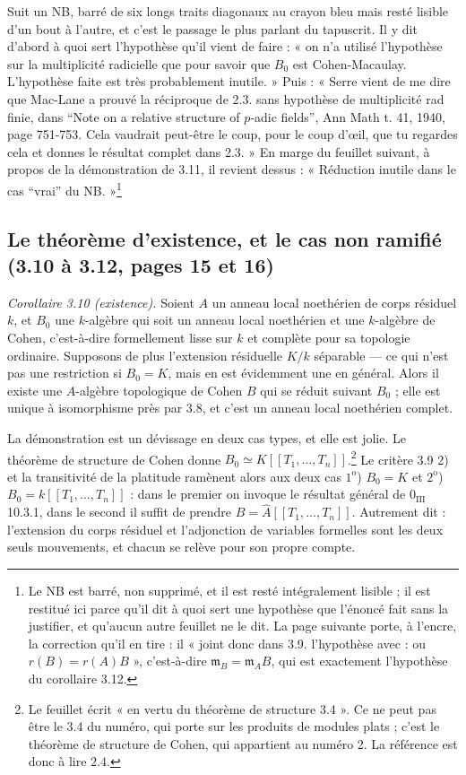 \documentclass[11pt,a4paper]{article}
\begin{document}
Suit un NB, barré de six longs traits diagonaux au crayon bleu mais resté
lisible d'un bout à l'autre, et c'est le passage le plus parlant du tapuscrit.
Il y dit d'abord à quoi sert l'hypothèse qu'il vient de faire : « on n'a
utilisé l'hypothèse sur la multiplicité radicielle que pour savoir que $B_0$
est Cohen-Macaulay. L'hypothèse faite est très probablement inutile. » Puis :
« Serre vient de me dire que Mac-Lane a prouvé la réciproque de 2.3. sans
hypothèse de multiplicité rad finie, dans “Note on a relative structure of
$p$-adic fields”, Ann Math t. 41, 1940, page 751-753. Cela vaudrait peut-être
le coup, pour le coup d'œil, que tu regardes cela et donnes le résultat complet
dans 2.3. » En marge du feuillet suivant, à propos de la démonstration de 3.11,
il revient dessus : « Réduction inutile dans le cas “vrai” du
NB. »\footnote{Le NB est barré, non supprimé, et il est resté intégralement
lisible ; il est restitué ici parce qu'il dit à quoi sert une hypothèse que
l'énoncé fait sans la justifier, et qu'aucun autre feuillet ne le dit. La page
suivante porte, à l'encre, la correction qu'il en tire : il « joint donc dans
3.9. l'hypothèse avec : ou $r(B) = r(A)B$ », c'est-à-dire
$\mathfrak{m}_B = \mathfrak{m}_A B$, qui est exactement l'hypothèse du
corollaire 3.12.}

\subsection*{Le théorème d'existence, et le cas non ramifié (3.10 à 3.12, pages 15 et 16)}

\emph{Corollaire 3.10 (existence).} Soient $A$ un anneau local noethérien de
corps résiduel $k$, et $B_0$ une $k$-algèbre qui soit un anneau local
noethérien et une $k$-algèbre de Cohen, c'est-à-dire formellement lisse sur $k$
et complète pour sa topologie ordinaire. Supposons de plus l'extension
résiduelle $K/k$ séparable — ce qui n'est pas une restriction si $B_0 = K$,
mais en est évidemment une en général. Alors il existe une $A$-algèbre
topologique de Cohen $B$ qui se réduit suivant $B_0$ ; elle est unique à
isomorphisme près par 3.8, et c'est un anneau local noethérien complet.

La démonstration est un dévissage en deux cas types, et elle est jolie. Le
théorème de structure de Cohen donne $B_0 \simeq K[[T_1, \ldots,
T_n]]$.\footnote{Le feuillet écrit « en vertu du théorème de structure 3.4 ».
Ce ne peut pas être le 3.4 du numéro, qui porte sur les produits de modules
plats ; c'est le théorème de structure de Cohen, qui appartient au numéro 2. La
référence est donc à lire $2.4$.} Le critère 3.9 2) et la transitivité de la
platitude ramènent alors aux deux cas $1^{\mathrm{o}}$) $B_0 = K$ et
$2^{\mathrm{o}}$) $B_0 = k[[T_1, \ldots, T_n]]$ : dans le premier on invoque le
résultat général de $0_{\mathrm{III}}$ 10.3.1, dans le second il suffit de
prendre $B = \hat{A}[[T_1, \ldots, T_n]]$. Autrement dit : l'extension du corps
résiduel et l'adjonction de variables formelles sont les deux seuls
mouvements, et chacun se relève pour son propre compte.
\end{document}
